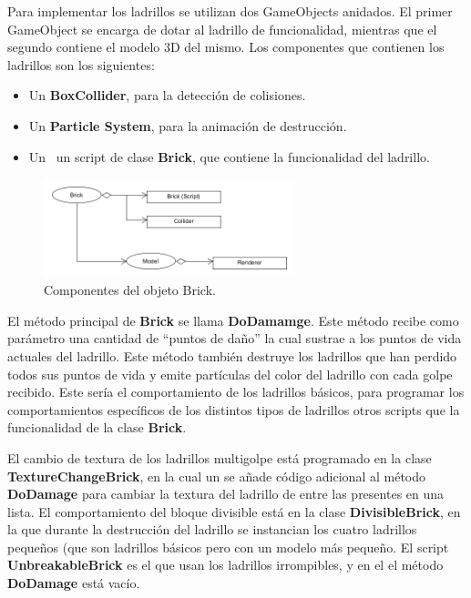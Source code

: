 Para implementar los ladrillos se utilizan dos GameObjects anidados. El primer GameObject se encarga de dotar al ladrillo de funcionalidad, mientras que el segundo contiene el modelo 3D del mismo. Los componentes que contienen los ladrillos son los siguientes: 
\begin{itemize}
\item Un \textbf{BoxCollider}, para la detección de colisiones.
\item Un \textbf{Particle System}, para la animación de destrucción.
\item Un \ un script de clase \textbf{Brick}, que contiene la funcionalidad del ladrillo.
\end{itemize}

\begin{figure}[h]
	\includegraphics[width=0.65\textwidth]{images/estructura/objetos/bricks}
	\centering
	\caption{Componentes del objeto Brick.}
\end{figure}

El método principal de \textbf{Brick} se llama \textbf{DoDamamge}. Este método recibe como parámetro una cantidad de ``puntos de daño'' la cual sustrae a los puntos de vida actuales del ladrillo. Este método también destruye los ladrillos que han perdido todos sus puntos de vida y emite partículas del color del ladrillo con cada golpe recibido. Este sería el comportamiento de los ladrillos básicos, para programar los comportamientos específicos de los distintos tipos de ladrillos otros scripts que la funcionalidad de la clase \textbf{Brick}.

El cambio de textura de los ladrillos multigolpe está programado en la clase \textbf{TextureChangeBrick}, en la cual un se añade código adicional al método \textbf{DoDamage} para cambiar la textura del ladrillo de entre las presentes en una lista. El comportamiento del bloque divisible está en la clase \textbf{DivisibleBrick}, en la que durante la destrucción del ladrillo se instancian los cuatro ladrillos pequeños (que son ladrillos básicos pero con un modelo más pequeño. El script \textbf{UnbreakableBrick} es el que usan los ladrillos irrompibles, y en el el método \textbf{DoDamage} está vacío.

